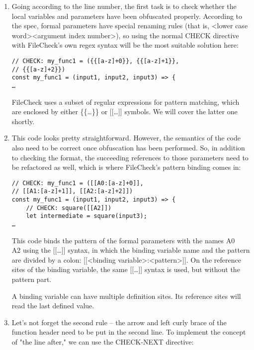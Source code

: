 \begin{enumerate}
\item Going according to the line number, the first task is to check whether the local variables and parameters have been obfuscated properly. According to the spec, formal parameters have special renaming rules (that is, <lower case word><argument index number>), so using the normal CHECK directive with FileCheck's own regex syntax will be the most suitable solution here:

\begin{lstlisting}[style=styleJavaScript]
// CHECK: my_func1 = ({{[a-z]+0}}, {{[a-z]+1}},
// {{[a-z]+2}})
const my_func1 = (input1, input2, input3) => {
…
\end{lstlisting}

FileCheck uses a subset of regular expressions for pattern matching, which are enclosed by either \{\{…\}\} or [[…]] symbols. We will cover the latter one shortly.

\item This code looks pretty straightforward. However, the semantics of the code also need to be correct once obfuscation has been performed. So, in addition to checking the format, the succeeding references to those parameters need to be refactored as well, which is where FileCheck's pattern binding comes in:

\begin{lstlisting}[style=styleJavaScript]
// CHECK: my_func1 = ([[A0:[a-z]+0]],
// [[A1:[a-z]+1]], [[A2:[a-z]+2]])
const my_func1 = (input1, input2, input3) => {
	// CHECK: square([[A2]])
	let intermediate = square(input3);
…
\end{lstlisting}

This code binds the pattern of the formal parameters with the names A0 ~ A2 using the [[…]] syntax, in which the binding variable name and the pattern are divided by a colon: [[<binding variable>:<pattern>]]. On the reference sites of the binding variable, the same [[…]] syntax is used, but without the pattern part.

\begin{tcolorbox}[colback=blue!5!white,colframe=blue!75!black, fonttitle=\bfseries,title=Note]
\hspace*{0.7cm}A binding variable can have multiple definition sites. Its reference sites will read the last defined value.
\end{tcolorbox}

\item Let's not forget the second rule – the arrow and left curly brace of the function header need to be put in the second line. To implement the concept of "the line after," we can use the CHECK-NEXT directive:


\end{enumerate}
